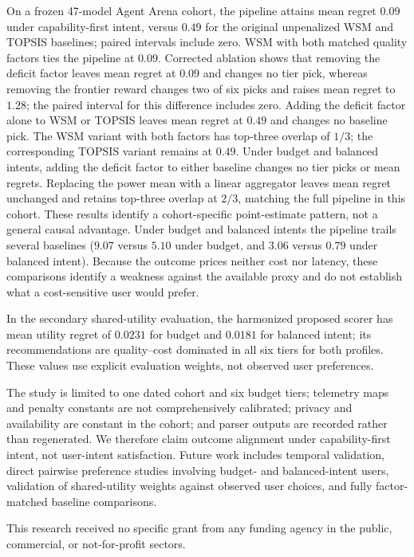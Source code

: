 \documentclass[pdflatex,sn-mathphys-num]{sn-jnl}
\theoremstyle{thmstyleone}
\theoremstyle{thmstylethree}
\begin{document}
On a frozen 47-model Agent Arena cohort, the pipeline attains mean regret $0.09$ under capability-first intent, versus $0.49$ for the original unpenalized WSM and TOPSIS baselines; paired intervals include zero. WSM with both matched quality factors ties the pipeline at $0.09$. Corrected ablation shows that removing the deficit factor leaves mean regret at $0.09$ and changes no tier pick, whereas removing the frontier reward changes two of six picks and raises mean regret to $1.28$; the paired interval for this difference includes zero. Adding the deficit factor alone to WSM or TOPSIS leaves mean regret at $0.49$ and changes no baseline pick. The WSM variant with both factors has top-three overlap of $1/3$; the corresponding TOPSIS variant remains at $0.49$. Under budget and balanced intents, adding the deficit factor to either baseline changes no tier picks or mean regrets. Replacing the power mean with a linear aggregator leaves mean regret unchanged and retains top-three overlap at $2/3$, matching the full pipeline in this cohort. These results identify a cohort-specific point-estimate pattern, not a general causal advantage. Under budget and balanced intents the pipeline trails several baselines ($9.07$ versus $5.10$ under budget, and $3.06$ versus $0.79$ under balanced intent). Because the outcome prices neither cost nor latency, these comparisons identify a weakness against the available proxy and do not establish what a cost-sensitive user would prefer.

In the secondary shared-utility evaluation, the harmonized proposed scorer has mean utility regret of $0.0231$ for budget and $0.0181$ for balanced intent; its recommendations are quality--cost dominated in all six tiers for both profiles. These values use explicit evaluation weights, not observed user preferences.

The study is limited to one dated cohort and six budget tiers; telemetry maps and penalty constants are not comprehensively calibrated; privacy and availability are constant in the cohort; and parser outputs are recorded rather than regenerated. We therefore claim outcome alignment under capability-first intent, not user-intent satisfaction. Future work includes temporal validation, direct pairwise preference studies involving budget- and balanced-intent users, validation of shared-utility weights against observed user choices, and fully factor-matched baseline comparisons.

This research received no specific grant from any funding agency in the public, commercial, or not-for-profit sectors.
\end{document}
